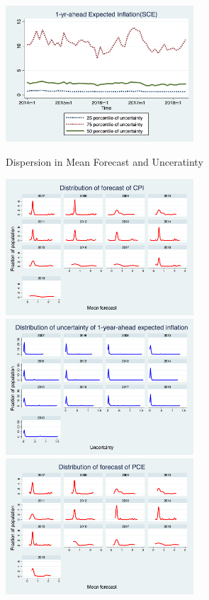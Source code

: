 \documentclass[]{article}
\begin{document}
\begin{figure}[ht]
	\includegraphics[width=7cm]{figures/IQRvarSCEM.png}\\
	\caption{Dispersion in Mean Forecast and Unceratinty }
	\label{IQR_Unceratitny}
\end{figure}


\begin{figure}[ht]
	\centering
	\includegraphics[width=7cm]{figures/PRCCPIMean1_hist.png} 
	\includegraphics[width=7cm]{figures/PRCCPIVar1_hist.png}  \\
	\smallskip
		\includegraphics[width=7cm]{figures/PRCPCEMean1_hist.png} 

\end{figure}
\end{document}
